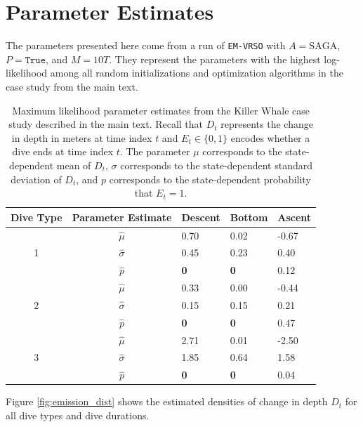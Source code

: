 \documentclass[12pt]{article}
\begin{document}
\section{Parameter Estimates}

The parameters presented here come from a run of \texttt{EM-VRSO} with $A = \text{SAGA}$, $P = \texttt{True}$, and $M=10T$. They represent the parameters with the highest log-likelihood among all random initializations and optimization algorithms in the case study from the main text. 

\begin{table}[h]
\centering
\begin{tabular}{c|c|lll}
\multicolumn{1}{l|}{Dive Type} & Parameter Estimate & Descent & Bottom & Ascent \\ \hline
\multirow{3}{*}{1}            & $\hat \mu$     & 0.70    & 0.02   & -0.67  \\
                              & $\hat \sigma$  & 0.45    & 0.23   & 0.40   \\
                              & $\hat p$       & \bf{0}  & \bf{0} & 0.12   \\ \hline 
\multirow{3}{*}{2}            & $\hat \mu$     & 0.33    & 0.00   & -0.44  \\
                              & $\hat \sigma$  & 0.15    & 0.15   & 0.21   \\
                              & $\hat p$       & \bf{0}  & \bf{0} & 0.47   \\ \hline
\multirow{3}{*}{3}            & $\hat \mu$     & 2.71    & 0.01   & -2.50  \\
                              & $\hat \sigma$  & 1.85    & 0.64   & 1.58   \\
                              & $\hat p$       & \bf{0}  & \bf{0} & 0.04  
\end{tabular}
\caption{Maximum likelihood parameter estimates from the Killer Whale case study described in the main text. Recall that $D_t$ represents the change in depth in meters at time index $t$ and $E_t \in \{0,1\}$ encodes whether a dive ends at time index $t$. The parameter $\mu$ corresponds to the state-dependent mean of $D_t$, $\sigma$ corresponds to the state-dependent standard deviation of $D_t$, and $p$ corresponds to the state-dependent probability that $E_t=1$.}
\end{table}

\newpage

Figure \ref{fig:emission_dist} shows the estimated densities of change in depth $D_t$ for all dive types and dive durations.
\end{document}
